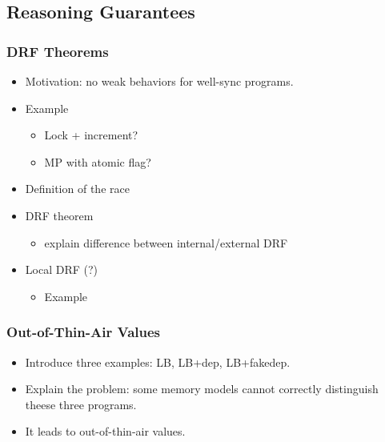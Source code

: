 \subsection{Reasoning Guarantees}

\subsubsection{DRF Theorems}
\label{sec:background:drf}

\begin{itemize}
  \item Motivation: no weak behaviors for well-sync programs.
  \item Example
  \begin{itemize}
    \item Lock + increment?
    \item MP with atomic flag?
  \end{itemize}
  \item Definition of the race
  \item DRF theorem
  \begin{itemize}
    \item explain difference between internal/external DRF
  \end{itemize}
  \item Local DRF (?)
  \begin{itemize}
    \item Example
  \end{itemize}
\end{itemize}

\subsubsection{Out-of-Thin-Air Values}
\label{sec:background:oota}

\begin{itemize}
  \item Introduce three examples: LB, LB+dep, LB+fakedep.
  \item Explain the problem: some memory models cannot 
    correctly distinguish theese three programs.
  \item It leads to out-of-thin-air values.
\end{itemize}



